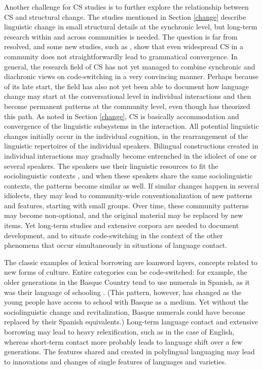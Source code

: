 \documentclass[output=paper,
modfonts
]{langscibook}
\begin{document}
Another challenge for CS studies is to further explore the relationship between CS and structural change. The studies mentioned in Section \ref{change} describe linguistic change in small structural details at the synchronic level, but long-term research within and across communities is needed.  The question is far from resolved, and some new studies, such as \cite{cacoullos2018bilingualism}, show that even widespread CS in a community does not straightforwardly lead to grammatical convergence. In general, the research field of CS has not yet managed to combine synchronic and diachronic views on code-switching in a very convincing manner. Perhaps because of its late start, the field has also not yet been able to document how language change may start at the conversational level in individual interactions and then become permanent patterns at the community level, even though \cite{matras2009language} has theorized this path. As noted in Section \ref{change},  CS is basically accommodation and convergence of the linguistic subsystems in the interaction. All potential linguistic changes initially occur in the individual cognition, in the rearrangement of the linguistic repertoires of the individual speakers. Bilingual constructions created in individual interactions may gradually become entrenched in the idiolect of one or several speakers. The speakers use their linguistic resources to fit the sociolinguistic contexts \parencite{heller2007bilingualism}, and when these speakers share the same sociolinguistic contexts, the patterns become similar as well. If similar changes happen in several idiolects, they may lead to community-wide conventionalization of new patterns and features, starting with small groups. Over time, these community patterns may become non-optional, and the original material may be replaced by new items. Yet long-term studies and extensive corpora are needed to document development, and to situate code-switching in the context of the other phenomena that occur simultaneously in situations of language contact.

The classic examples of lexical borrowing are loanword layers, concepts related to new forms of culture. Entire categories can be code-switched: for example, the older generations in the Basque Country tend to use numerals in Spanish, as it was their language of schooling \parencite{lantto2015conventionalized}. (This pattern, however, has changed as the young people have access to school with Basque as a medium. Yet without the sociolinguistic change and revitalization, Basque numerals could have become replaced by their Spanish equivalents.) Long-term language contact and extensive borrowing may lead to heavy relexification, such as in the case of English, whereas short-term contact more probably leads to language shift over a few generations. The features shared and created in polylingual languaging may lead to innovations and changes of single features of languages and varieties.
\end{document}
